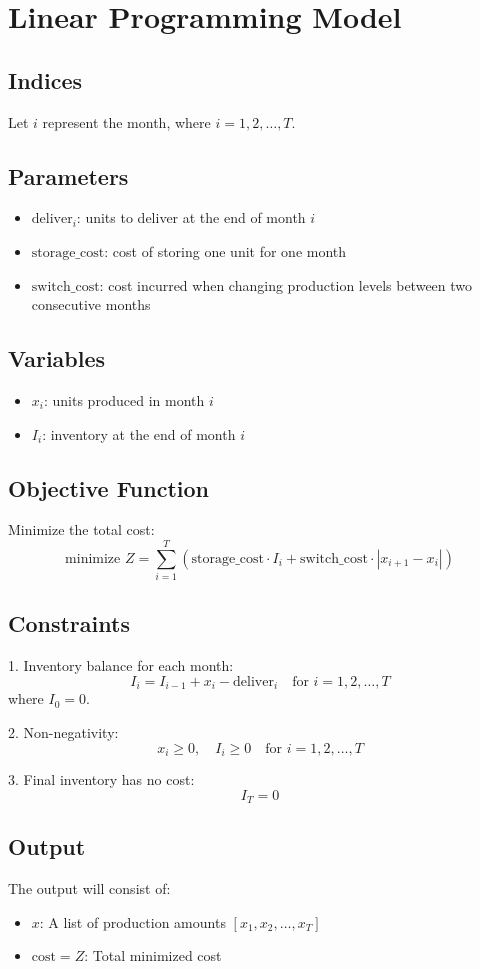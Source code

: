 \documentclass{article}
\begin{document}
\section*{Linear Programming Model}

\subsection*{Indices}
Let \( i \) represent the month, where \( i = 1, 2, \ldots, T \).

\subsection*{Parameters}
\begin{itemize}
    \item \( \text{deliver}_i \): units to deliver at the end of month \( i \)
    \item \( \text{storage\_cost} \): cost of storing one unit for one month
    \item \( \text{switch\_cost} \): cost incurred when changing production levels between two consecutive months
\end{itemize}

\subsection*{Variables}
\begin{itemize}
    \item \( x_i \): units produced in month \( i \)
    \item \( I_i \): inventory at the end of month \( i \) 
\end{itemize}

\subsection*{Objective Function}
Minimize the total cost:
\[
\text{minimize } Z = \sum_{i=1}^{T} \left( \text{storage\_cost} \cdot I_i + \text{switch\_cost} \cdot |x_{i+1} - x_i| \right)
\]

\subsection*{Constraints}
1. Inventory balance for each month:
\[
I_i = I_{i-1} + x_i - \text{deliver}_i \quad \text{for } i = 1, 2, \ldots, T
\]
   where \( I_0 = 0 \).

2. Non-negativity:
\[
x_i \geq 0, \quad I_i \geq 0 \quad \text{for } i = 1, 2, \ldots, T
\]

3. Final inventory has no cost:
\[
I_T = 0
\]

\subsection*{Output}
The output will consist of:
\begin{itemize}
    \item \( x \): A list of production amounts \( [x_1, x_2, \ldots, x_T] \)
    \item \( \text{cost} = Z \): Total minimized cost
\end{itemize}
\end{document}
